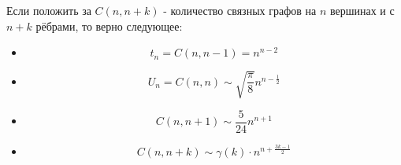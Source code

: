 \begin{note}
	Если положить за $C(n, n + k)$ - количество связных графов на $n$ вершинах и с $n + k$ рёбрами, то верно следующее:
	\begin{itemize}
		\item \[
			t_n = C(n, n - 1) = n^{n - 2}
		\]
		
		\item \[
			U_n = C(n, n) \sim \sqrt{\frac{\pi}{8}} n^{n - \frac{1}{2}}
		\]
		
		\item \[
			C(n, n + 1) \sim \frac{5}{24}n^{n + 1}
		\]
		
		\item \[
			C(n, n + k) \sim \gamma(k) \cdot n^{n + \frac{3k - 1}{2}}
		\]
	\end{itemize}
\end{note}